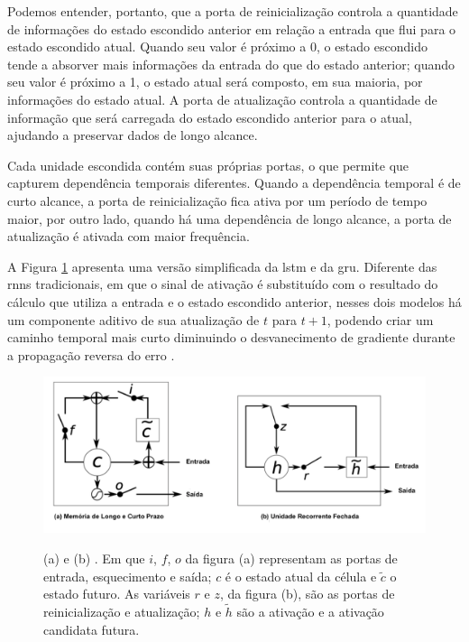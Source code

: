Podemos entender, portanto, que a porta de reinicialização controla a quantidade de informações do estado escondido anterior em relação a entrada que flui para o estado escondido atual. Quando seu valor é próximo a 0, o estado escondido tende a absorver mais informações da entrada do que do estado anterior; quando seu valor é próximo a 1, o estado atual será composto, em sua maioria, por informações do estado atual. A porta de atualização controla a quantidade de informação que será carregada do estado escondido anterior para o atual, ajudando a preservar dados de longo alcance.

Cada unidade escondida contém suas próprias portas, o que permite que capturem dependência temporais diferentes. Quando a dependência temporal é de curto alcance, a porta de reinicialização fica ativa por um período de tempo maior, por outro lado, quando há uma dependência de longo alcance, a porta de atualização é ativada com maior frequência.

A Figura \ref{fig:lstm-vs-gru} apresenta uma versão simplificada da \gls{lstm} e da \gls{gru}. Diferente das \glspl{rnn} tradicionais, em que o sinal de ativação é substituído com o resultado do cálculo que utiliza a entrada e o estado escondido anterior, nesses dois modelos há um componente aditivo de sua atualização de $t$ para $t + 1$, podendo criar um caminho temporal mais curto diminuindo o desvanecimento de gradiente durante a propagação reversa do erro \cite{Chung2014Empirical}.

\begin{figure}[htbp]
    \centering
        \caption[Comparativo entre a  e a .]{(a)  e (b) . Em que $i$, $f$, $o$ da figura (a) representam as portas de entrada, esquecimento e saída; $c$ é o estado atual da célula e $\tilde{c}$ o estado futuro. As variáveis $r$ e $z$, da figura (b), são as portas de reinicialização e atualização; $h$ e $\tilde{h}$ são a ativação e a ativação candidata futura.}
        \includegraphics[width=\textwidth]{resources/images/pln/lstm-vs-gru.png}
        \label{fig:lstm-vs-gru}
\end{figure}

